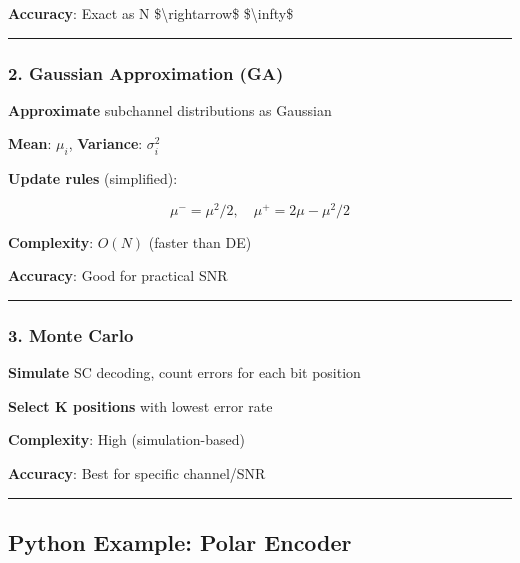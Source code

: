 \textbf{Accuracy}: Exact as N \$\textbackslash rightarrow\$
\$\textbackslash infty\$

\begin{center}\rule{0.5\linewidth}{0.5pt}\end{center}

\subsubsection{2. Gaussian Approximation
(GA)}\label{gaussian-approximation-ga}

\textbf{Approximate} subchannel distributions as Gaussian

\textbf{Mean}: \(\mu_i\), \textbf{Variance}: \(\sigma_i^2\)

\textbf{Update rules} (simplified):

\[
\mu^- = \mu^2 / 2, \quad \mu^+ = 2\mu - \mu^2 / 2
\]

\textbf{Complexity}: \(O(N)\) (faster than DE)

\textbf{Accuracy}: Good for practical SNR

\begin{center}\rule{0.5\linewidth}{0.5pt}\end{center}

\subsubsection{3. Monte Carlo}\label{monte-carlo}

\textbf{Simulate} SC decoding, count errors for each bit position

\textbf{Select K positions} with lowest error rate

\textbf{Complexity}: High (simulation-based)

\textbf{Accuracy}: Best for specific channel/SNR

\begin{center}\rule{0.5\linewidth}{0.5pt}\end{center}

\subsection{Python Example: Polar
Encoder}\label{python-example-polar-encoder}

